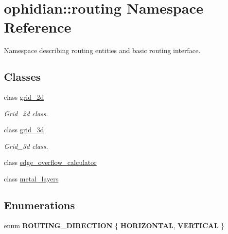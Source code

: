 \hypertarget{namespaceophidian_1_1routing}{\section{ophidian\-:\-:routing Namespace Reference}
\label{namespaceophidian_1_1routing}
}


Namespace describing routing entities and basic routing interface.  


\subsection*{Classes}
\begin{DoxyCompactItemize}
\item 
class \hyperlink{classophidian_1_1routing_1_1grid__2d}{grid\-\_\-2d}
\begin{DoxyCompactList}\small\item\em Grid\-\_\-2d class. \end{DoxyCompactList}\item 
class \hyperlink{classophidian_1_1routing_1_1grid__3d}{grid\-\_\-3d}
\begin{DoxyCompactList}\small\item\em Grid\-\_\-3d class. \end{DoxyCompactList}\item 
class \hyperlink{classophidian_1_1routing_1_1edge__overflow__calculator}{edge\-\_\-overflow\-\_\-calculator}
\item 
class \hyperlink{classophidian_1_1routing_1_1metal__layers}{metal\-\_\-layers}
\end{DoxyCompactItemize}
\subsection*{Enumerations}
\begin{DoxyCompactItemize}
\item 
enum {\bfseries R\-O\-U\-T\-I\-N\-G\-\_\-\-D\-I\-R\-E\-C\-T\-I\-O\-N} \{ {\bfseries H\-O\-R\-I\-Z\-O\-N\-T\-A\-L}, 
{\bfseries V\-E\-R\-T\-I\-C\-A\-L}
 \}
\end{DoxyCompactItemize}
